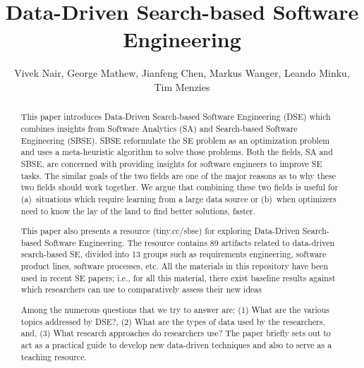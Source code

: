 \documentclass[sigconf,anonymous,review]{acmart}
\begin{document}
\title{Data-Driven Search-based Software Engineering}

\author{Vivek Nair, George Mathew, Jianfeng Chen, Markus Wanger, Leando Minku, Tim Menzies}
\email{}


\begin{abstract}
This paper introduces Data-Driven Search-based Software Engineering (DSE) which combines insights from Software Analytics (SA) and Search-based Software Engineering (SBSE). SBSE reformulate the SE problem as an optimization problem and uses a meta-heuristic algorithm to solve those problems. Both the fields, SA and SBSE, are concerned with providing insights for software engineers to improve SE tasks. The similar goals of the two fields are one of the major reasons as to why these two fields should work together. 
We argue that  
combining these two fields
is useful for (a)~situations which require learning from a large data
source or (b)~when optimizers need to know the lay of the land to find better solutions, faster.


This paper also presents a  resource (tiny.cc/sbse) for exploring
Data-Driven Search-based Software Engineering.  The resource contains 89 artifacts related to data-driven search-based SE,
divided into 13 groups such as requirements engineering, software product lines, software processes, etc.
All the materials in this repository
have been   used in recent SE papers; i.e., for all this material, there exist baseline results against which researchers can use to comparatively assess their new ideas


Among the numerous questions that we try to answer are: (1) What are the various topics addressed by DSE?, (2) What are the types of data used by the researchers, and, (3) What research approaches do researchers use? The paper briefly sets out to act as a practical guide to develop new data-driven techniques and also to serve as a teaching resource.
\end{abstract}
\end{document}
